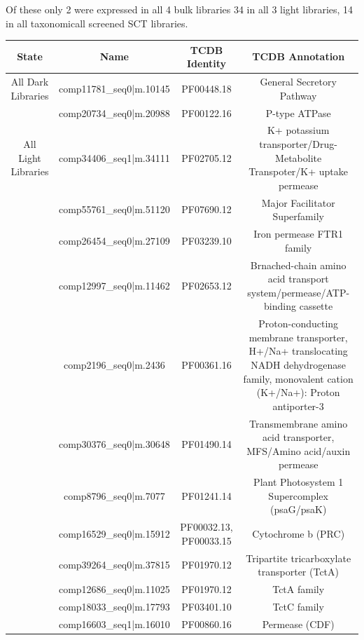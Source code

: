 Of these only 2 were expressed in all 4 bulk libraries 34 in all 3 light libraries, 14 in all taxonomicall screened SCT libraries.

\begin{table}
    \begin{tabular}{|c|c|c|c|}
        \hline
        \textbf{State} & \textbf{Name} & \textbf{TCDB Identity} & \textbf{TCDB Annotation}\\
        \hline
        All Dark Libraries  & comp11781\_seq0|m.10145 & PF00448.18 & General Secretory Pathway \\
                            & comp20734\_seq0|m.20988 & PF00122.16 & P-type ATPase \\
        \hline
        All Light Libraries & comp34406\_seq1|m.34111 & PF02705.12 & K+ potassium transporter/Drug-Metabolite Transpoter/K+ uptake permease\\
                            & comp55761\_seq0|m.51120 & PF07690.12 & Major Facilitator Superfamily \\  %
                            & comp26454\_seq0|m.27109 & PF03239.10 & Iron permease FTR1 family  \\
                            & comp12997\_seq0|m.11462 & PF02653.12 & Brnached-chain amino acid transport system/permease/ATP-binding cassette\\
                            & comp2196\_seq0|m.2436   & PF00361.16 & Proton-conducting membrane transporter, H+/Na+ translocating NADH dehydrogenase family, monovalent cation (K+/Na+): Proton antiporter-3 \\
                            & comp30376\_seq0|m.30648 & PF01490.14 & Transmembrane amino acid transporter, MFS/Amino acid/auxin permease\\
                            & comp8796\_seq0|m.7077   & PF01241.14 & Plant Photosystem 1 Supercomplex (psaG/psaK) \\
                            & comp16529\_seq0|m.15912 & PF00032.13, PF00033.15 & Cytochrome b (PRC) \\
                            & comp39264\_seq0|m.37815 & PF01970.12 & Tripartite tricarboxylate transporter (TctA) \\
                            & comp12686\_seq0|m.11025 & PF01970.12 & TctA family  \\
                            & comp18033\_seq0|m.17793 & PF03401.10 & TctC family \\
                            & comp16603\_seq1|m.16010 & PF00860.16 & Permease (CDF) \\

\end{tabular}
\end{table}
